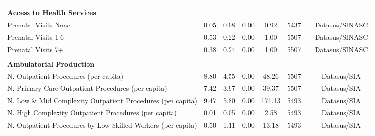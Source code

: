 \begin{table}[H]
\begin{footnotesize}
\begin{center}
{\begin{threeparttable}[b]
\begin{tabular}{rrrrrrrr}
          &       &       &       &       &       &       &  \\
    \multicolumn{1}{l}{\textbf{Access to Health Services}} &       &       &       &       &       &       &  \\
    \multicolumn{1}{l}{Prenatal Visits None} & \multicolumn{1}{c}{0.05} & \multicolumn{1}{c}{0.08} & \multicolumn{1}{c}{0.00} & \multicolumn{1}{c}{0.92} & \multicolumn{1}{c}{5437} &       & \multicolumn{1}{c}{Datasus/SINASC} \\
    \multicolumn{1}{l}{Prenatal Visits 1-6} & \multicolumn{1}{c}{0.53} & \multicolumn{1}{c}{0.22} & \multicolumn{1}{c}{0.00} & \multicolumn{1}{c}{1.00} & \multicolumn{1}{c}{5507} &       & \multicolumn{1}{c}{Datasus/SINASC} \\
    \multicolumn{1}{l}{Prenatal Visits 7+} & \multicolumn{1}{c}{0.38} & \multicolumn{1}{c}{0.24} & \multicolumn{1}{c}{0.00} & \multicolumn{1}{c}{1.00} & \multicolumn{1}{c}{5507} &       & \multicolumn{1}{c}{Datasus/SINASC} \\
          &       &       &       &       &       &       &  \\
    \multicolumn{1}{l}{\textbf{Ambulatorial Production}} &       &       &       &       &       &       &  \\
    \multicolumn{1}{l}{N. Outpatient Procedures (per capita)} & \multicolumn{1}{c}{8.80} & \multicolumn{1}{c}{4.55} & \multicolumn{1}{c}{0.00} & \multicolumn{1}{c}{48.26} & \multicolumn{1}{c}{5507} &       & \multicolumn{1}{c}{Datasus/SIA} \\
    \multicolumn{1}{l}{N. Primary Care Outpatient Procedures (per capita)} & \multicolumn{1}{c}{7.42} & \multicolumn{1}{c}{3.97} & \multicolumn{1}{c}{0.00} & \multicolumn{1}{c}{39.37} & \multicolumn{1}{c}{5507} &       & \multicolumn{1}{c}{Datasus/SIA} \\
    \multicolumn{1}{l}{N. Low \& Mid Complexity Outpatient Procedures (per capita)} & \multicolumn{1}{c}{9.47} & \multicolumn{1}{c}{5.80} & \multicolumn{1}{c}{0.00} & \multicolumn{1}{c}{171.13} & \multicolumn{1}{c}{5493} &       & \multicolumn{1}{c}{Datasus/SIA} \\
    \multicolumn{1}{l}{N. High Complexity Outpatient Procedures (per capita)} & \multicolumn{1}{c}{0.01} & \multicolumn{1}{c}{0.05} & \multicolumn{1}{c}{0.00} & \multicolumn{1}{c}{2.58} & \multicolumn{1}{c}{5493} &       & \multicolumn{1}{c}{Datasus/SIA} \\
    \multicolumn{1}{l}{N. Outpatient Procedures by Low Skilled Workers (per capita)} & \multicolumn{1}{c}{0.50} & \multicolumn{1}{c}{1.11} & \multicolumn{1}{c}{0.00} & \multicolumn{1}{c}{13.18} & \multicolumn{1}{c}{5493} &       & \multicolumn{1}{c}{Datasus/SIA} \\

\end{tabular}
\end{threeparttable}}
\end{center}
\end{footnotesize}
\end{table}
